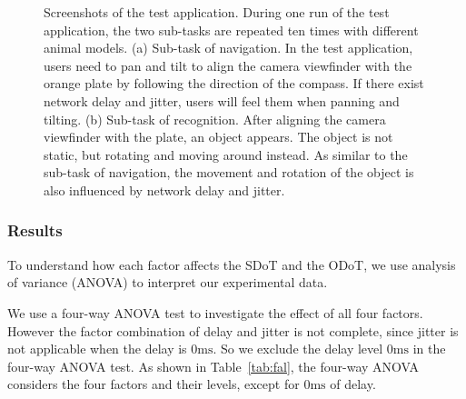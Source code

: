 \begin{figure}
	\centering
	\caption{Screenshots of the test application. During one run of the test application, the two sub-tasks are repeated ten times with different animal models. (a) Sub-task of navigation. In the test application, users need to pan and tilt to align the camera viewfinder with the orange plate by following the direction of the compass. If there exist network delay and jitter, users will feel them when panning and tilting. (b) Sub-task of recognition. After aligning the camera viewfinder with the plate, an object appears. The object is not static, but rotating and moving around instead. As similar to the sub-task of navigation, the movement and rotation of the object is also influenced by network delay and jitter.}
	\label{fig:us}
\end{figure}

\subsubsection{Results}
\label{sec:hrr:us:ms:r}

To understand how each factor affects the SDoT and the ODoT, we use analysis of variance (ANOVA) to interpret our experimental data.

We use a four-way ANOVA test to investigate the effect of all four factors. However the factor combination of delay and jitter is not complete, since jitter is not applicable when the delay is $0\mathrm{ms}$. So we exclude the delay level $0\mathrm{ms}$ in the four-way ANOVA test.
As shown in Table~\ref{tab:fal}, the four-way ANOVA considers the four factors and their levels, except for $0\mathrm{ms}$ of delay.

